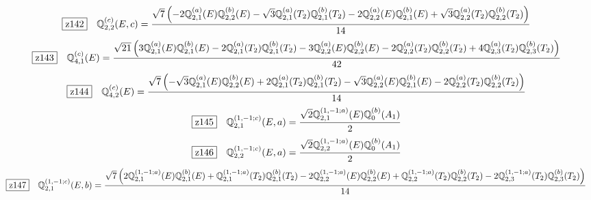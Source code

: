 \documentclass[fleqn,10pt,landscape]{jsarticle}
\begin{document}
\begin{dmath*}
\hspace*{3mm}\fbox{z142}\quad \mathbb{Q}_{2,2}^{(c)}(E,c)=\frac{\sqrt{7} \left(- 2 \mathbb{Q}_{2,1}^{(a)}(E) \mathbb{Q}_{2,2}^{(b)}(E) - \sqrt{3} \mathbb{Q}_{2,1}^{(a)}(T_{2}) \mathbb{Q}_{2,1}^{(b)}(T_{2}) - 2 \mathbb{Q}_{2,2}^{(a)}(E) \mathbb{Q}_{2,1}^{(b)}(E) + \sqrt{3} \mathbb{Q}_{2,2}^{(a)}(T_{2}) \mathbb{Q}_{2,2}^{(b)}(T_{2})\right)}{14}
\end{dmath*}
\begin{dmath*}
\hspace*{3mm}\fbox{z143}\quad \mathbb{Q}_{4,1}^{(c)}(E)=\frac{\sqrt{21} \left(3 \mathbb{Q}_{2,1}^{(a)}(E) \mathbb{Q}_{2,1}^{(b)}(E) - 2 \mathbb{Q}_{2,1}^{(a)}(T_{2}) \mathbb{Q}_{2,1}^{(b)}(T_{2}) - 3 \mathbb{Q}_{2,2}^{(a)}(E) \mathbb{Q}_{2,2}^{(b)}(E) - 2 \mathbb{Q}_{2,2}^{(a)}(T_{2}) \mathbb{Q}_{2,2}^{(b)}(T_{2}) + 4 \mathbb{Q}_{2,3}^{(a)}(T_{2}) \mathbb{Q}_{2,3}^{(b)}(T_{2})\right)}{42}
\end{dmath*}
\begin{dmath*}
\hspace*{3mm}\fbox{z144}\quad \mathbb{Q}_{4,2}^{(c)}(E)=\frac{\sqrt{7} \left(- \sqrt{3} \mathbb{Q}_{2,1}^{(a)}(E) \mathbb{Q}_{2,2}^{(b)}(E) + 2 \mathbb{Q}_{2,1}^{(a)}(T_{2}) \mathbb{Q}_{2,1}^{(b)}(T_{2}) - \sqrt{3} \mathbb{Q}_{2,2}^{(a)}(E) \mathbb{Q}_{2,1}^{(b)}(E) - 2 \mathbb{Q}_{2,2}^{(a)}(T_{2}) \mathbb{Q}_{2,2}^{(b)}(T_{2})\right)}{14}
\end{dmath*}
\begin{dmath*}
\hspace*{3mm}\fbox{z145}\quad \mathbb{Q}_{2,1}^{(1,-1;c)}(E,a)=\frac{\sqrt{2} \mathbb{Q}_{2,1}^{(1,-1;a)}(E) \mathbb{Q}_{0}^{(b)}(A_{1})}{2}
\end{dmath*}
\begin{dmath*}
\hspace*{3mm}\fbox{z146}\quad \mathbb{Q}_{2,2}^{(1,-1;c)}(E,a)=\frac{\sqrt{2} \mathbb{Q}_{2,2}^{(1,-1;a)}(E) \mathbb{Q}_{0}^{(b)}(A_{1})}{2}
\end{dmath*}
\begin{dmath*}
\hspace*{3mm}\fbox{z147}\quad \mathbb{Q}_{2,1}^{(1,-1;c)}(E,b)=\frac{\sqrt{7} \left(2 \mathbb{Q}_{2,1}^{(1,-1;a)}(E) \mathbb{Q}_{2,1}^{(b)}(E) + \mathbb{Q}_{2,1}^{(1,-1;a)}(T_{2}) \mathbb{Q}_{2,1}^{(b)}(T_{2}) - 2 \mathbb{Q}_{2,2}^{(1,-1;a)}(E) \mathbb{Q}_{2,2}^{(b)}(E) + \mathbb{Q}_{2,2}^{(1,-1;a)}(T_{2}) \mathbb{Q}_{2,2}^{(b)}(T_{2}) - 2 \mathbb{Q}_{2,3}^{(1,-1;a)}(T_{2}) \mathbb{Q}_{2,3}^{(b)}(T_{2})\right)}{14}
\end{dmath*}
\end{document}

